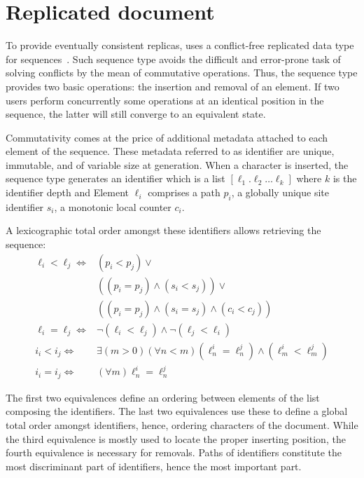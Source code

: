 
\section{Replicated document}
\label{sec:structure}

To provide eventually consistent replicas, \CRATE uses a conflict-free
replicated data type for sequences~\cite{shapiro2011comprehensive}. Such
sequence type avoids the difficult and error-prone task of solving conflicts by
the mean of commutative operations. Thus, the sequence type provides two basic
operations: the insertion and removal of an element. If two users perform
concurrently some operations at an identical position in the sequence, the
latter will still converge to an equivalent state.

Commutativity comes at the price of additional metadata attached to each
element of the sequence. These metadata referred to as identifier are unique,
immutable, and of variable size at generation. When a character is inserted, the
sequence type generates an identifier which is a list
$[\ell_1.\ell_2\ldots \ell_k]$ where $k$ is the identifier depth and Element
$\ell_i$ comprises a path $p_i$, a globally unique site identifier $s_i$, a
monotonic local counter $c_i$.

A lexicographic total order amongst these identifiers allows retrieving the
sequence:
\begin{align*}
  \ell_i < \ell_j \iff & (p_i < p_j) \vee \\
                       & ((p_i = p_j) \wedge (s_i<s_j)) \vee \\
                       & ((p_i = p_j) \wedge (s_i = s_j) \wedge (c_i < c_j)) \\
  \ell_i = \ell_j \iff & \neg (\ell_i < \ell_j) \wedge \neg (\ell_j < \ell_i) \\
  i_i < i_j \iff & \exists (m > 0)(\forall n < m) (\ell^i_n = \ell^j_n) \wedge (\ell^i_m < \ell^j_m) \\
  i_i = i_j \iff & (\forall m) \ell^i_n = \ell^j_n
\end{align*}

The first two equivalences define an ordering between elements of the list
composing the identifiers. The last two equivalences use these to define a
global total order amongst identifiers, hence, ordering characters of the
document. While the third equivalence is mostly used to locate the proper
inserting position, the fourth equivalence is necessary for removals.  Paths of
identifiers constitute the most discriminant part of identifiers, hence the most
important part.

